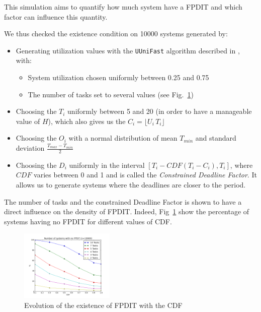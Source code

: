 \documentclass[conference]{IEEEtran}
\begin{document}
	This simulation aims to quantify how much system have a FPDIT and which factor can influence this quantity.

	We thus checked the existence condition on 10000 systems generated by:
	\begin{itemize}
		\item Generating utilization values with the \texttt{UUniFast} algorithm described in \cite{bini2005measuring}, with:
		\begin{itemize}
			\item System utilization chosen uniformly between 0.25 and 0.75
			\item The number of tasks set to several values (see Fig.~\ref{fig:noFPDIT})
		\end{itemize}
		\item Choosing the $T_i$ uniformly between 5 and 20 (in order to have a manageable value of $H$), which also gives us the $C_i = \lfloor U_i \, T_i \rfloor$
		\item Choosing the $O_i$ with a normal distribution of mean $T_{min}$ and standard deviation $\frac{T_{max} - T_{min}}{2}$
		\item Choosing the $D_i$ uniformly in the interval $[T_i - CDF(T_i - C_i), T_i]$, where $CDF$ varies between 0 and 1 and is called the \emph{Constrained Deadline Factor}. It allows us to generate systems where the deadlines are closer to the period.
	\end{itemize}

	The number of tasks and the constrained Deadline Factor is shown to have a direct influence on the density of FPDIT. Indeed, Fig~\ref{fig:noFPDIT} show the percentage of systems having no FPDIT for different values of CDF.

	\begin{figure}[h]
	\begin{center}
		\includegraphics[width=0.4\textwidth]{figs/nofpdit_4.png}
	\end{center}
	\caption{Evolution of the existence of FPDIT with the CDF}
	\label{fig:noFPDIT}
	\end{figure}
\end{document}
